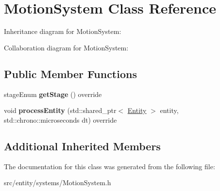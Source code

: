 \hypertarget{classMotionSystem}{\section{Motion\-System Class Reference}
\label{classMotionSystem}
}


Inheritance diagram for Motion\-System\-:


Collaboration diagram for Motion\-System\-:
\subsection*{Public Member Functions}
\begin{DoxyCompactItemize}
\item 
\hypertarget{classMotionSystem_a4578d9fd296650d754c5131a8baeec27}{stage\-Enum {\bfseries get\-Stage} () override}\label{classMotionSystem_a4578d9fd296650d754c5131a8baeec27}

\item 
\hypertarget{classMotionSystem_a30d345cb7231e8467691f354bbf81c5d}{void {\bfseries process\-Entity} (std\-::shared\-\_\-ptr$<$ \hyperlink{classEntity}{Entity} $>$ entity, std\-::chrono\-::microseconds dt) override}\label{classMotionSystem_a30d345cb7231e8467691f354bbf81c5d}

\end{DoxyCompactItemize}
\subsection*{Additional Inherited Members}


The documentation for this class was generated from the following file\-:\begin{DoxyCompactItemize}
\item 
src/entity/systems/Motion\-System.\-h\end{DoxyCompactItemize}
